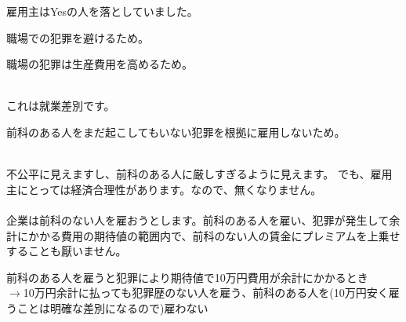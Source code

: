 \begin{frame}{}
雇用主はYesの人を落としていました。
\begin{dinglist}{43}
\vspace{1.0ex}\setlength{\itemsep}{1.0ex}\setlength{\baselineskip}{12pt}
\pause
\item	職場での犯罪を避けるため。
\item	職場の犯罪は生産費用を高めるため。\\~\\
\end{dinglist}
\pause
これは就業差別です。
\begin{dinglist}{43}
\vspace{1.0ex}\setlength{\itemsep}{1.0ex}\setlength{\baselineskip}{12pt}
\pause
\item	前科のある人をまだ起こしてもいない犯罪を根拠に雇用しないため。\\~\\
\end{dinglist}
\pause
不公平に見えますし、前科のある人に厳しすぎるように見えます。\pause
でも、雇用主にとっては経済合理性があります。なので、無くなりません。\\~\\

\pause
企業は前科のない人を雇おうとします。前科のある人を雇い、犯罪が発生して余計にかかる費用の期待値の範囲内で、前科のない人の賃金にプレミアムを上乗せすることも厭いません。
\pause
\begin{dinglist}{43}
\vspace{1.0ex}\setlength{\itemsep}{1.0ex}\setlength{\baselineskip}{12pt}
\item	前科のある人を雇うと犯罪により期待値で10万円費用が余計にかかるとき\\$\rightarrow$10万円余計に払っても犯罪歴のない人を雇う、前科のある人を(10万円安く雇うことは明確な差別になるので)雇わない
\end{dinglist}
\end{frame}


